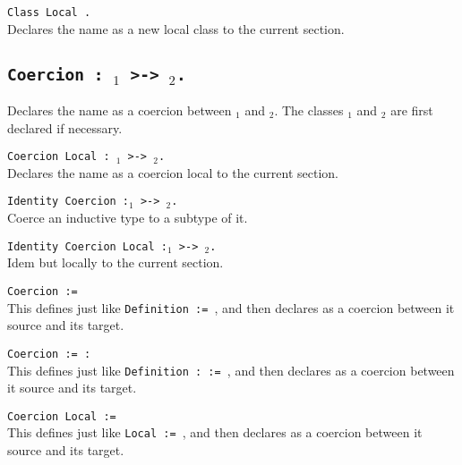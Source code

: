 \begin{coq_example}
\begin{Variant}
\item {\tt Class Local {\ident}.} \\
Declares the name {\ident} as a new local class to the current section.
\end{Variant}

\subsection{\tt Coercion {\ident} : {\ident$_1$} >-> {\ident$_2$}.}

Declares the name {\ident} as a coercion between {\ident$_1$} and
{\ident$_2$}. The classes {\ident$_1$} and {\ident$_2$} are first
declared if necessary.

\begin{Variants}
\item {\tt Coercion Local {\ident} : {\ident$_1$} >-> {\ident$_2$}.}\\
Declares the name {\ident} as a coercion local to the current section.

\item {\tt Identity Coercion {\ident}:{\ident$_1$} >->
    {\ident$_2$}.}\\
Coerce an inductive type to a subtype of it.

\item {\tt Identity Coercion Local {\ident}:{\ident$_1$} >-> {\ident$_2$}.} \\
Idem but locally to the current section.

\item {\tt Coercion {\ident} := {\term}}\\
  This defines {\ident} just like \texttt{Definition {\ident} :=
    {\term}}, and then declares {\ident} as a coercion between it
  source and its target.

\item {\tt Coercion {\ident} := {\term} : {\type}}\\
  This defines {\ident} just like 
  \texttt{Definition {\ident} : {\type} := {\term}}, and then
  declares {\ident} as a coercion between it source and its target. 

\item {\tt Coercion Local {\ident} := {\term}}\\
  This defines {\ident} just like \texttt{Local {\ident} :=
    {\term}}, and then declares {\ident} as a coercion between it
  source and its target.


\end{Variants}
\end{coq_example}
